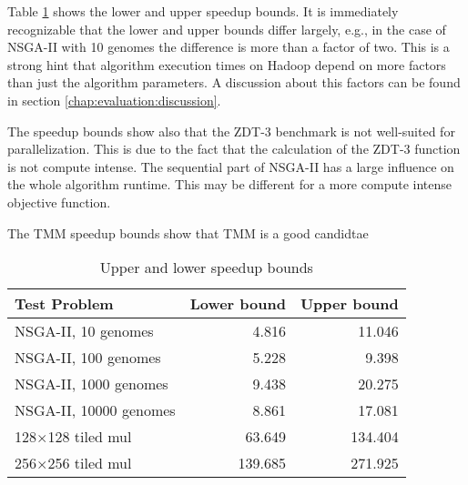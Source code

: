 Table \ref{table:speedup_bounds} shows the lower and upper speedup bounds. It is immediately recognizable that the lower and upper bounds differ largely, e.g., in the case of NSGA-II with 10 genomes the difference is more than a factor of two. This is a strong hint that algorithm execution times on Hadoop depend on more factors than just the algorithm parameters. A discussion about this factors can be found in section \ref{chap:evaluation:discussion}.

The speedup bounds show also that the ZDT-3 benchmark is not well-suited for parallelization. This is due to the fact that the calculation of the ZDT-3 function is not compute intense. The sequential part of NSGA-II has a large influence on the whole algorithm runtime. This may be different for a more compute intense objective function.

The TMM speedup bounds show that TMM is a good candidtae


\begin{table}
  \centering
  \caption{Upper and lower speedup bounds}
  \begin{tabular}{lrr}\toprule[2pt]
    Test Problem & Lower bound & Upper bound \\ \midrule
    NSGA-II, 10 genomes & 4.816 & 11.046 \\ %
    NSGA-II, 100 genomes & 5.228 & 9.398 \\ %
    NSGA-II, 1000 genomes & 9.438 & 20.275 \\ %
    NSGA-II, 10000 genomes & 8.861 & 17.081 \\ %
    128$\times$128 tiled mul & 63.649 & 134.404 \\ %
    256$\times$256 tiled mul & 139.685 & 271.925 \\ \bottomrule[2pt] %
  \end{tabular}
  \label{table:speedup_bounds}
\end{table}


